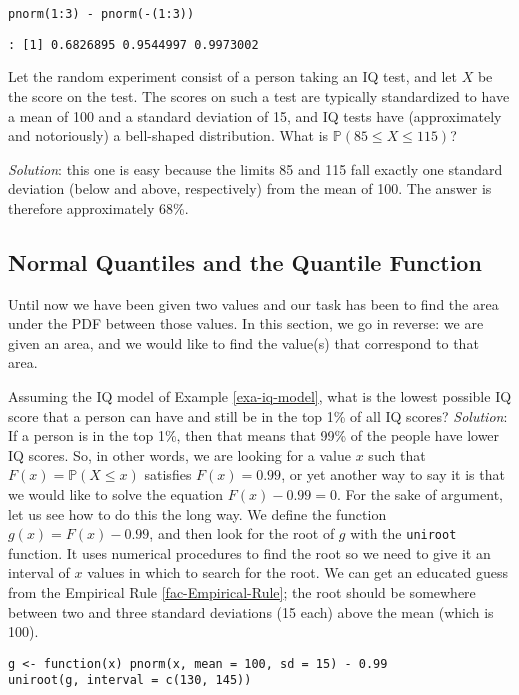 \begin{verbatim}
pnorm(1:3) - pnorm(-(1:3))
\end{verbatim}

\begin{verbatim}
: [1] 0.6826895 0.9544997 0.9973002
\end{verbatim}

\label{exa-iq-model} Let the random experiment consist of a person taking
an IQ test, and let \(X\) be the score on the test. The scores on such
a test are typically standardized to have a mean of 100 and a standard
deviation of 15, and IQ tests have (approximately and notoriously) a
bell-shaped distribution. What is \(\mathbb{P}(85\leq X\leq115)\)?

\emph{Solution}: this one is easy because the limits 85 and 115 fall
exactly one standard deviation (below and above, respectively) from
the mean of 100. The answer is therefore approximately 68\%.

\subsection{Normal Quantiles and the Quantile Function}
\label{sec-6-3-1}

Until now we have been given two values and our task has been to find
the area under the PDF between those values. In this section, we go in
reverse: we are given an area, and we would like to find the value(s)
that correspond to that area.

\label{exa-iq-quantile-state-problem} Assuming the IQ model of Example
\ref{exa-iq-model}, what is the lowest possible IQ score that a person can
have and still be in the top 1\% of all IQ scores?  \emph{Solution}: If a
person is in the top 1\%, then that means that 99\% of the people have
lower IQ scores. So, in other words, we are looking for a value \(x\)
such that \(F(x)=\mathbb{P}(X\leq x)\) satisfies \(F(x)=0.99\), or yet
another way to say it is that we would like to solve the equation
\(F(x)-0.99=0\). For the sake of argument, let us see how to do this
the long way. We define the function \(g(x)=F(x)-0.99\), and then look
for the root of \(g\) with the \texttt{uniroot} function. It uses numerical
procedures to find the root so we need to give it an interval of \(x\)
values in which to search for the root. We can get an educated guess
from the Empirical Rule \ref{fac-Empirical-Rule}; the root should be
somewhere between two and three standard deviations (15 each) above
the mean (which is 100).
\begin{verbatim}
g <- function(x) pnorm(x, mean = 100, sd = 15) - 0.99
uniroot(g, interval = c(130, 145))
\end{verbatim}

